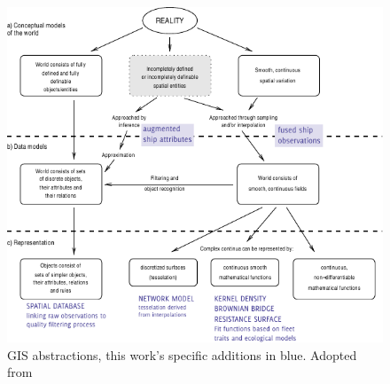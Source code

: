 


\begin{figure}[htbp]
  \centering
  \includegraphics[width=160mm]{figures/representation-in-gis.pdf}
  \caption{GIS abstractions, this work's specific {\color{DBlue} additions in blue}. Adopted from \cite{Bivand2011}}
  \label{fig:representation-in-gis}
\end{figure}




